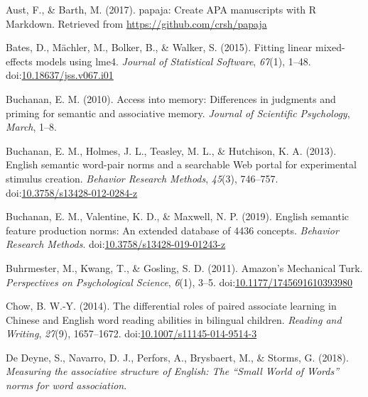 \documentclass[english,,man]{apa6}
\begin{document}
\setlength{\parindent}{-0.5in}
\setlength{\leftskip}{0.5in}

\hypertarget{refs}{}
\leavevmode\hypertarget{ref-Aust2017}{}%
Aust, F., \& Barth, M. (2017). papaja: Create APA manuscripts with R Markdown. Retrieved from \url{https://github.com/crsh/papaja}

\leavevmode\hypertarget{ref-Bates2015}{}%
Bates, D., Mächler, M., Bolker, B., \& Walker, S. (2015). Fitting linear mixed-effects models using lme4. \emph{Journal of Statistical Software}, \emph{67}(1), 1--48. doi:\href{https://doi.org/10.18637/jss.v067.i01}{10.18637/jss.v067.i01}

\leavevmode\hypertarget{ref-Buchanan2010}{}%
Buchanan, E. M. (2010). Access into memory: Differences in judgments and priming for semantic and associative memory. \emph{Journal of Scientific Psychology}, \emph{March}, 1--8.

\leavevmode\hypertarget{ref-Buchanan2013}{}%
Buchanan, E. M., Holmes, J. L., Teasley, M. L., \& Hutchison, K. A. (2013). English semantic word-pair norms and a searchable Web portal for experimental stimulus creation. \emph{Behavior Research Methods}, \emph{45}(3), 746--757. doi:\href{https://doi.org/10.3758/s13428-012-0284-z}{10.3758/s13428-012-0284-z}

\leavevmode\hypertarget{ref-Buchanan2019}{}%
Buchanan, E. M., Valentine, K. D., \& Maxwell, N. P. (2019). English semantic feature production norms: An extended database of 4436 concepts. \emph{Behavior Research Methods}. doi:\href{https://doi.org/10.3758/s13428-019-01243-z}{10.3758/s13428-019-01243-z}

\leavevmode\hypertarget{ref-Buhrmester2011}{}%
Buhrmester, M., Kwang, T., \& Gosling, S. D. (2011). Amazon's Mechanical Turk. \emph{Perspectives on Psychological Science}, \emph{6}(1), 3--5. doi:\href{https://doi.org/10.1177/1745691610393980}{10.1177/1745691610393980}

\leavevmode\hypertarget{ref-Chow2014}{}%
Chow, B. W.-Y. (2014). The differential roles of paired associate learning in Chinese and English word reading abilities in bilingual children. \emph{Reading and Writing}, \emph{27}(9), 1657--1672. doi:\href{https://doi.org/10.1007/s11145-014-9514-3}{10.1007/s11145-014-9514-3}

\leavevmode\hypertarget{ref-DeDeyne2018}{}%
De Deyne, S., Navarro, D. J., Perfors, A., Brysbaert, M., \& Storms, G. (2018). \emph{Measuring the associative structure of English: The ``Small World of Words'' norms for word association}.
\end{document}
